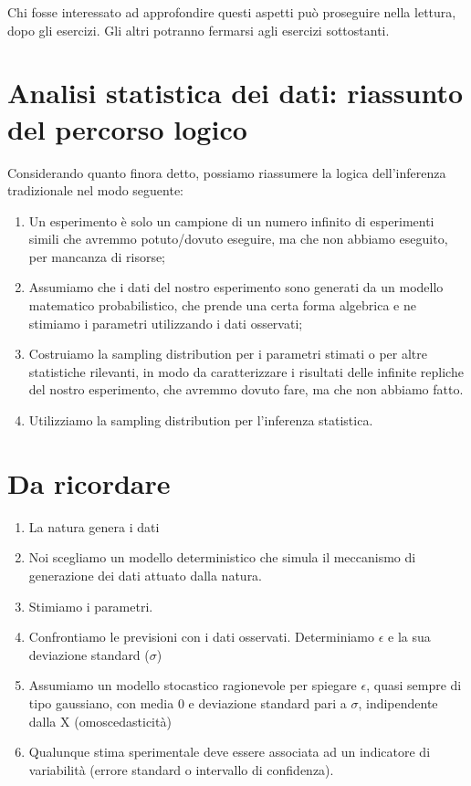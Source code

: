 \documentclass[a4paper,12pt,oneside]{book}
\providecommand{\tightlist}{%
  \setlength{\itemsep}{0pt}\setlength{\parskip}{0pt}}
\begin{document}
Chi fosse interessato ad approfondire questi aspetti può proseguire nella lettura, dopo gli esercizi. Gli altri potranno fermarsi agli esercizi sottostanti.

\hypertarget{analisi-statistica-dei-dati-riassunto-del-percorso-logico}{%
\section{Analisi statistica dei dati: riassunto del percorso logico}\label{analisi-statistica-dei-dati-riassunto-del-percorso-logico}}

Considerando quanto finora detto, possiamo riassumere la logica dell'inferenza tradizionale nel modo seguente:

\begin{enumerate}
\def\labelenumi{\arabic{enumi}.}
\tightlist
\item
  Un esperimento è solo un campione di un numero infinito di esperimenti simili che avremmo potuto/dovuto eseguire, ma che non abbiamo eseguito, per mancanza di risorse;
\item
  Assumiamo che i dati del nostro esperimento sono generati da un modello matematico probabilistico, che prende una certa forma algebrica e ne stimiamo i parametri utilizzando i dati osservati;
\item
  Costruiamo la sampling distribution per i parametri stimati o per altre statistiche rilevanti, in modo da caratterizzare i risultati delle infinite repliche del nostro esperimento, che avremmo dovuto fare, ma che non abbiamo fatto.
\item
  Utilizziamo la sampling distribution per l'inferenza statistica.
\end{enumerate}

\hypertarget{da-ricordare}{%
\section{Da ricordare}\label{da-ricordare}}

\begin{enumerate}
\def\labelenumi{\arabic{enumi}.}
\tightlist
\item
  La natura genera i dati
\item
  Noi scegliamo un modello deterministico che simula il meccanismo di generazione dei dati attuato dalla natura.
\item
  Stimiamo i parametri.
\item
  Confrontiamo le previsioni con i dati osservati. Determiniamo \(\epsilon\) e la sua deviazione standard (\(\sigma\))
\item
  Assumiamo un modello stocastico ragionevole per spiegare \(\epsilon\), quasi sempre di tipo gaussiano, con media 0 e deviazione standard pari a \(\sigma\), indipendente dalla X (omoscedasticità)
\item
  Qualunque stima sperimentale deve essere associata ad un indicatore di variabilità (errore standard o intervallo di confidenza).
\end{enumerate}
\end{document}
